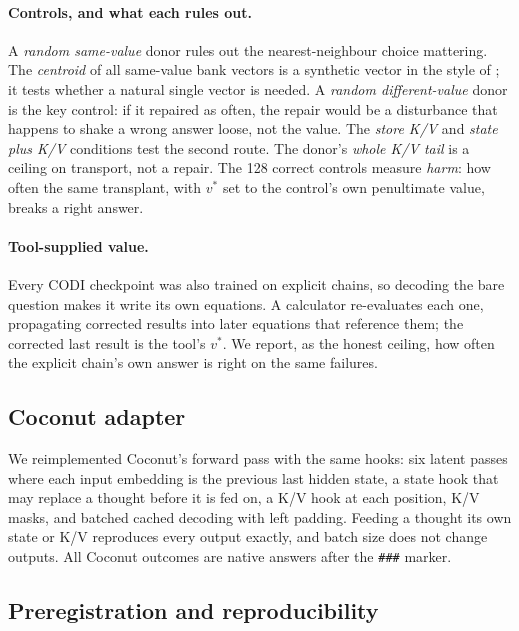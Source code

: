 \documentclass{article}
\begin{document}
\paragraph{Controls, and what each rules out.} A \emph{random same-value} donor rules out the nearest-neighbour choice mattering. The \emph{centroid} of all same-value bank vectors is a synthetic vector in the style of \citet{cywinski2025}; it tests whether a natural single vector is needed. A \emph{random different-value} donor is the key control: if it repaired as often, the repair would be a disturbance that happens to shake a wrong answer loose, not the value. The \emph{store K/V} and \emph{state plus K/V} conditions test the second route. The donor's \emph{whole K/V tail} is a ceiling on transport, not a repair. The 128 correct controls measure \emph{harm}: how often the same transplant, with $v^*$ set to the control's own penultimate value, breaks a right answer.

\paragraph{Tool-supplied value.} Every CODI checkpoint was also trained on explicit chains, so decoding the bare question makes it write its own equations. A calculator re-evaluates each one, propagating corrected results into later equations that reference them; the corrected last result is the tool's $v^*$. We report, as the honest ceiling, how often the explicit chain's own answer is right on the same failures.

\subsection{Coconut adapter}\label{sec:coconut-method}

We reimplemented Coconut's forward pass with the same hooks: six latent passes where each input embedding is the previous last hidden state, a state hook that may replace a thought before it is fed on, a K/V hook at each position, K/V masks, and batched cached decoding with left padding. Feeding a thought its own state or K/V reproduces every output exactly, and batch size does not change outputs. All Coconut outcomes are native answers after the \texttt{\#\#\#} marker.

\subsection{Preregistration and reproducibility}
\end{document}

